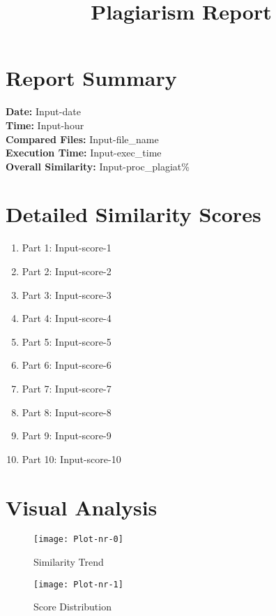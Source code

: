 \documentclass[12pt]{article}
\title{Plagiarism Report}
\begin{document}
\maketitle
\section*{Report Summary}
\textbf{Date:} Input-date\\
\textbf{Time:} Input-hour\\
\textbf{Compared Files:} Input-file_name\\
\textbf{Execution Time:} Input-exec_time\\
\textbf{Overall Similarity:} Input-proc_plagiat\%

\section*{Detailed Similarity Scores}
\begin{enumerate}
\item Part 1: Input-score-1
\item Part 2: Input-score-2
\item Part 3: Input-score-3
\item Part 4: Input-score-4
\item Part 5: Input-score-5
\item Part 6: Input-score-6
\item Part 7: Input-score-7
\item Part 8: Input-score-8
\item Part 9: Input-score-9
\item Part 10: Input-score-10
\end{enumerate}

\section*{Visual Analysis}
\begin{figure}[H]
    \centering
    \texttt{[image: Plot-nr-0]}
    \caption{Similarity Trend}
\end{figure}

\begin{figure}[H]
    \centering
    \texttt{[image: Plot-nr-1]}
    \caption{Score Distribution}
\end{figure}
\end{document}
